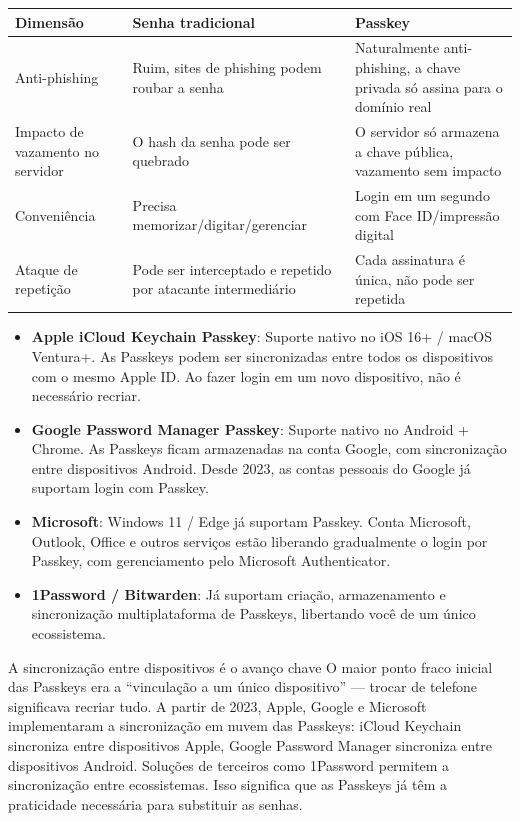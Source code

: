 \begin{center}
\begin{tabularx}{\linewidth}{|X|X|X|}
\hline
\textbf{Dimensão} & \textbf{Senha tradicional} & \textbf{Passkey} \tabularnewline
\hline
Anti-phishing & Ruim, sites de phishing podem roubar a senha & Naturalmente anti-phishing, a chave privada só assina para o domínio real \tabularnewline
Impacto de vazamento no servidor & O hash da senha pode ser quebrado & O servidor só armazena a chave pública, vazamento sem impacto \tabularnewline
Conveniência & Precisa memorizar/digitar/gerenciar & Login em um segundo com Face ID/impressão digital \tabularnewline
Ataque de repetição & Pode ser interceptado e repetido por atacante intermediário & Cada assinatura é única, não pode ser repetida \tabularnewline
\hline
\end{tabularx}
\end{center}


\begin{itemize}
  \item \textbf{Apple iCloud Keychain Passkey}: Suporte nativo no iOS 16+ / macOS Ventura+. As Passkeys podem ser sincronizadas entre todos os dispositivos com o mesmo Apple ID. Ao fazer login em um novo dispositivo, não é necessário recriar.
  \item \textbf{Google Password Manager Passkey}: Suporte nativo no Android + Chrome. As Passkeys ficam armazenadas na conta Google, com sincronização entre dispositivos Android. Desde 2023, as contas pessoais do Google já suportam login com Passkey.
  \item \textbf{Microsoft}: Windows 11 / Edge já suportam Passkey. Conta Microsoft, Outlook, Office e outros serviços estão liberando gradualmente o login por Passkey, com gerenciamento pelo Microsoft Authenticator.
  \item \textbf{1Password / Bitwarden}: Já suportam criação, armazenamento e sincronização multiplataforma de Passkeys, libertando você de um único ecossistema.
\end{itemize}

\begin{tcbinfo}{A sincronização entre dispositivos é o avanço chave}
O maior ponto fraco inicial das Passkeys era a “vinculação a um único dispositivo” — trocar de telefone significava recriar tudo. A partir de 2023, Apple, Google e Microsoft implementaram a sincronização em nuvem das Passkeys: iCloud Keychain sincroniza entre dispositivos Apple, Google Password Manager sincroniza entre dispositivos Android. Soluções de terceiros como 1Password permitem a sincronização entre ecossistemas. Isso significa que as Passkeys já têm a praticidade necessária para substituir as senhas.

\end{tcbinfo}


